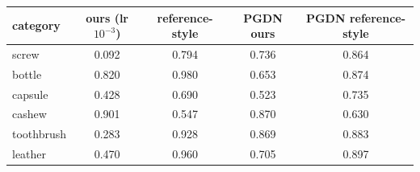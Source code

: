\setlength{\tabcolsep}{3pt}
\begin{tabular}{@{}lcccc@{}}
\toprule
category & \draem{} ours (lr $10^{-3}$) & \draem{} reference-style & PGDN ours & PGDN reference-style \\
\midrule
screw & 0.092 & 0.794 & 0.736 & 0.864 \\
bottle & 0.820 & 0.980 & 0.653 & 0.874 \\
capsule & 0.428 & 0.690 & 0.523 & 0.735 \\
cashew & 0.901 & 0.547 & 0.870 & 0.630 \\
toothbrush & 0.283 & 0.928 & 0.869 & 0.883 \\
leather & 0.470 & 0.960 & 0.705 & 0.897 \\
\bottomrule
\end{tabular}
